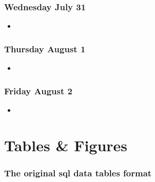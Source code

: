 \documentclass[12pt]{article}
\begin{document}
\subsubsection{Wednesday July 31}
\begin{itemize}
    \item 
\end{itemize}

\subsubsection{Thursday August 1}
\begin{itemize}
    \item 
\end{itemize}

\subsubsection{Friday August 2}
\begin{itemize}
    \item 
\end{itemize}


\section{Tables & Figures}

\subsubsection{The original sql data tables format}
\end{document}
